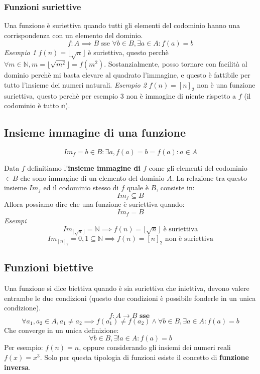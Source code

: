 \documentclass{article}
\begin{document}
\subsubsection{Funzioni suriettive}
Una funzione è suriettiva quando tutti gli elementi del codominio hanno una corrispondenza con un elemento del dominio.
$$f:A\implies B\text{ sse } \forall b\in B, \exists a \in A : f(a)=b$$
\noindent
\textit{Esempio 1}
\newline
$f(n)=\lfloor\sqrt{n}\rfloor$ è suriettiva, questo perchè $\forall m\in \mathbb{N}, m=\lfloor\sqrt{m^2}\rfloor=f(m^2)$. Sostanzialmente, posso tornare con facilità al dominio perchè mi basta elevare al quadrato l'immagine, e questo è fattibile per tutto l'insieme dei numeri naturali.
\noindent
\newline
\linebreak
\textit{Esempio 2}
\newline
$f(n)=[n]_2$ non è una funzione suriettiva, questo perchè per esempio $3$ non è immagine di niente rispetto a $f$ (il codominio è tutto $\mathbb{n}$).

\subsection{Insieme immagine di una funzione}
$$Im_f={b\in B:\exists a,f(a)=b}={f(a):a\in A}$$

Data $f$ definitiamo l'\textbf{insieme immagine di $f$} come gli elementi del codominio $\in B$ che sono immagine di un elemento del dominio $A$.
\newline
La relazione tra questo insieme $Im_f$ ed il codominio stesso di $f$ quale è $B$, consiste in:
$$Im_f\subseteq B$$
Allora possiamo dire che una funzione è suriettiva quando:
$$Im_f=B$$
\newline
\textit{Esempi}
$$Im_{\lfloor\sqrt{n}\rfloor}=\mathbb{N}\implies f(n)=\lfloor\sqrt{n}\rfloor \text{ è suriettiva}$$
$$Im_{[n]_2}={0,1}\subseteq \mathbb{N} \implies f(n)=[n]_2 \text{ non è suriettiva}$$

\subsection{Funzioni biettive}
Una funzione si dice biettiva quando è sia suriettiva che iniettiva, devono valere entrambe le due condizioni (questo due condizioni è possibile fonderle in un unica condizione).
$$f:A\rightarrow B \textbf{ sse }$$
$$\forall a_1,a_2 \in A, a_1\neq a_2 \implies f(a_1)\neq f(a_2) \land \forall b\in B, \exists a\in A:f(a)=b$$
Che converge in un unica definizione:
$$\forall b \in B,\exists !a\in A : f(a)=b$$
Per esempio: $f(n)=n$, oppure considerando gli insiemi dei numeri reali $f(x)=x^3$. Solo per questa tipologia di funzioni esiste il concetto di \textbf{funzione inversa}.
\end{document}

